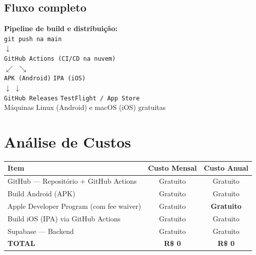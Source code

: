 \documentclass[12pt, a4paper]{article}
\begin{document}
\subsection{Fluxo completo}

\begin{caixainfo}
  \textbf{Pipeline de build e distribui\c{c}\~ao:}\\[6pt]
  \texttt{git push na main}\\
  $\downarrow$\\
  \texttt{GitHub Actions (CI/CD na nuvem)}\\
  $\swarrow$ \hspace{4cm} $\searrow$\\
  \texttt{APK (Android)} \hspace{2.5cm} \texttt{IPA (iOS)}\\
  $\downarrow$ \hspace{5.5cm} $\downarrow$\\
  \texttt{GitHub Releases} \hspace{2cm} \texttt{TestFlight / App Store}\\[4pt]
  {\small\color{cinza}M\'aquinas Linux (Android) e macOS (iOS) gratuitas}
\end{caixainfo}


\section{An\'alise de Custos}

\begin{table}[H]
\centering
\renewcommand{\arraystretch}{1.6}
\begin{tabularx}{\textwidth}{Xcc}
\toprule
\textbf{Item} & \textbf{Custo Mensal} & \textbf{Custo Anual} \\
\midrule
GitHub --- Reposit\'orio + GitHub Actions & Gratuito & Gratuito \\
Build Android (APK) & Gratuito & Gratuito \\
Apple Developer Program (com fee waiver) & Gratuito & \textbf{Gratuito} \\
Build iOS (IPA) via GitHub Actions & Gratuito & Gratuito \\
Supabase --- Backend & Gratuito & Gratuito \\
\midrule
\textbf{TOTAL} & \textbf{R\$ 0} & \textbf{R\$ 0} \\
\bottomrule
\end{tabularx}
\end{table}
\end{document}
